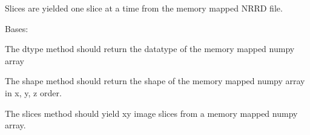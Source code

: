 \documentclass[letterpaper,10pt,english]{sphinxmanual}
\begin{document}
\begin{fulllineitems}
\begin{fulllineitems}
\end{fulllineitems}


\begin{fulllineitems}
\label{SliceGenerator:SliceGenerator.NrrdSliceGenerator.slices}
Slices are yielded one slice at a time from the memory mapped NRRD file.

\end{fulllineitems}


\end{fulllineitems}


\begin{fulllineitems}
\label{SliceGenerator:SliceGenerator.SliceGenerator}
Bases: 

\begin{fulllineitems}
\label{SliceGenerator:SliceGenerator.SliceGenerator.dtype}
The dtype method should return the datatype of the memory mapped numpy array

\end{fulllineitems}


\begin{fulllineitems}
\label{SliceGenerator:SliceGenerator.SliceGenerator.shape}
The shape method should return the shape of the memory mapped numpy array in x, y, z order.

\end{fulllineitems}


\begin{fulllineitems}
\label{SliceGenerator:SliceGenerator.SliceGenerator.slices}
The slices method should yield xy image slices from a memory mapped numpy array.

\end{fulllineitems}


\end{fulllineitems}
\end{document}
